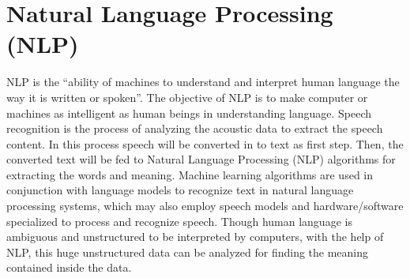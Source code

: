 \documentclass[sigconf]{acmart}
\begin{document}
\section{Natural Language Processing (NLP)} 
NLP is the ``ability of machines to understand and interpret human language the way it is written or spoken''. The objective of NLP is to make computer or machines as intelligent as human beings in understanding language. Speech recognition is the process of analyzing the acoustic data to extract the speech content. In this process speech will be converted in to text as first step. Then, the converted text will be fed to Natural Language Processing (NLP) algorithms for extracting the words and meaning. Machine learning algorithms are used in conjunction with language models to recognize text in natural language processing systems, which may also employ speech models and hardware/software specialized to process and recognize speech. Though human language is ambiguous and unstructured to be interpreted by computers, with the help of NLP, this huge unstructured data can be analyzed for finding the meaning contained inside the data. 
\end{document}
